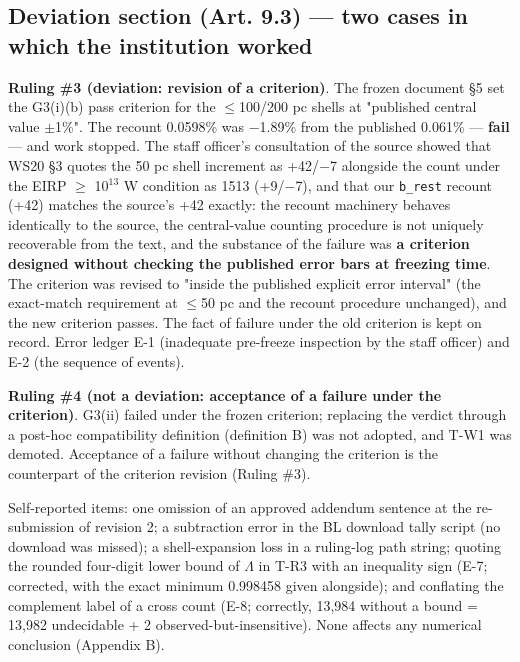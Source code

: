 \documentclass{aa}
\begin{document}
\subsection{Deviation section (Art. 9.3) --- two cases in which the institution worked}
\noindent \textbf{Ruling \#3 (deviation: revision of a criterion)}. The frozen document \S{}5 set the G3(i)(b) pass criterion for the \(\leq\)100/200 pc shells at "published central value \(\pm\)1\%". The recount 0.0598\% was \(-\)1.89\% from the published 0.061\% --- \textbf{fail} --- and work stopped. The staff officer's consultation of the source showed that WS20 \S{}3 quotes the 50 pc shell increment as +42/\(-\)7 alongside the count under the EIRP \(\geq\) 10\(^{13}\) W condition as 1513 (+9/\(-\)7), and that our \texttt{b\_rest} recount (+42) matches the source's +42 exactly: the recount machinery behaves identically to the source, the central-value counting procedure is not uniquely recoverable from the text, and the substance of the failure was \textbf{a criterion designed without checking the published error bars at freezing time}. The criterion was revised to "inside the published explicit error interval" (the exact-match requirement at \(\leq\)50 pc and the recount procedure unchanged), and the new criterion passes. The fact of failure under the old criterion is kept on record. Error ledger E-1 (inadequate pre-freeze inspection by the staff officer) and E-2 (the sequence of events).\par\smallskip
\noindent \textbf{Ruling \#4 (not a deviation: acceptance of a failure under the criterion)}. G3(ii) failed under the frozen criterion; replacing the verdict through a post-hoc compatibility definition (definition B) was not adopted, and T-W1 was demoted. Acceptance of a failure without changing the criterion is the counterpart of the criterion revision (Ruling \#3).\par\smallskip
\noindent Self-reported items: one omission of an approved addendum sentence at the re-submission of revision 2; a subtraction error in the BL download tally script (no download was missed); a shell-expansion loss in a ruling-log path string; quoting the rounded four-digit lower bound of \(\Lambda\) in T-R3 with an inequality sign (E-7; corrected, with the exact minimum 0.998458 given alongside); and conflating the complement label of a cross count (E-8; correctly, 13,984 without a bound = 13,982 undecidable + 2 observed-but-insensitive). None affects any numerical conclusion (Appendix B).\par\smallskip
\end{document}
